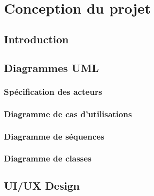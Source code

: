 \section{Conception du projet}
\subsection{Introduction}
\subsection{Diagrammes UML}
\subsubsection{Spécification des acteurs}
\subsubsection{Diagramme de cas d'utilisations}
\subsubsection{Diagramme de séquences}
\subsubsection{Diagramme de classes}
\subsection{UI/UX Design}

